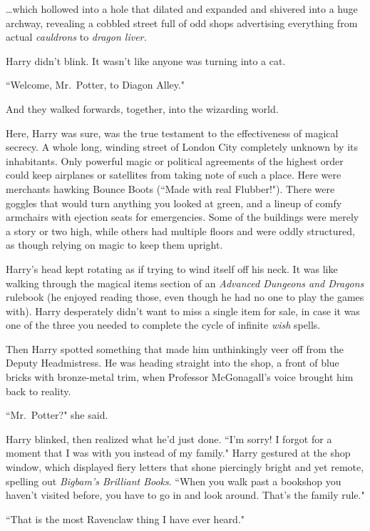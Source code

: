 {\ldots}which hollowed into a hole that dilated and expanded and shivered into a huge archway, revealing a cobbled street full of odd shops advertising everything from actual \emph{cauldrons} to \emph{dragon liver.}

Harry didn't blink. It wasn't like anyone was turning into a cat.

``Welcome, Mr.~Potter, to Diagon Alley."

And they walked forwards, together, into the wizarding world.

Here, Harry was sure, was the true testament to the effectiveness of magical secrecy. A whole long, winding street of London City completely unknown by its inhabitants. Only powerful magic or political agreements of the highest order could keep airplanes or satellites from taking note of such a place. Here were merchants hawking Bounce Boots (``Made with real Flubber!"). There were goggles that would turn anything you looked at green, and a lineup of comfy armchairs with ejection seats for emergencies. Some of the buildings were merely a story or two high, while others had multiple floors and were oddly structured, as though relying on magic to keep them upright.

Harry's head kept rotating as if trying to wind itself off his neck. It was like walking through the magical items section of an \emph{Advanced Dungeons and Dragons} rulebook (he enjoyed reading those, even though he had no one to play the games with). Harry desperately didn't want to miss a single item for sale, in case it was one of the three you needed to complete the cycle of infinite \emph{wish} spells.

Then Harry spotted something that made him unthinkingly veer off from the Deputy Headmistress. He was heading straight into the shop, a front of blue bricks with bronze-metal trim, when Professor McGonagall's voice brought him back to reality.

``Mr.~Potter?" she said.

Harry blinked, then realized what he'd just done. ``I'm sorry! I forgot for a moment that I was with you instead of my family." Harry gestured at the shop window, which displayed fiery letters that shone piercingly bright and yet remote, spelling out \emph{Bigbam's Brilliant Books}. ``When you walk past a bookshop you haven't visited before, you have to go in and look around. That's the family rule."

``That is the most Ravenclaw thing I have ever heard."

